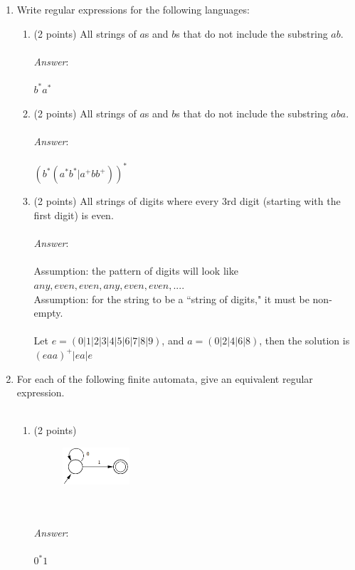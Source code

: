 \documentclass{article}
\begin{document}
\begin{enumerate}
  \item Write regular expressions for the following languages:
  \begin{enumerate}
    \item (2 points) All strings of $a$s and $b$s that do not include the
          substring $ab$.\\\\
      \textit{Answer}:\\\\
      $b^{*}a^{*}$\\

    \item (2 points) All strings of $a$s and $b$s that do not include the
          substring $aba$.\\\\
      \textit{Answer}:\\\\
      $(b^{*}(a^{*}b^{*} | a^{+}bb^{+}))^{*}$\\

    \item (2 points) All strings of digits where every 3rd digit (starting
          with the first digit) is even.\\\\
      \textit{Answer}: \\\\
      Assumption: the pattern of digits will look like
      $any, even, even, any, even, even, ...$.\\
      Assumption: for the string to be a ``string of digits," it must be non-empty.\\\\
      Let $e = (0|1|2|3|4|5|6|7|8|9)$, and $a = (0|2|4|6|8)$, then the solution is\\
      $(eaa)^{+} | ea | e$\\
  \end{enumerate}

  \item For each of the following finite automata, give an equivalent regular
        expression.\\\\
  \begin{enumerate}
    \item (2 points)
    \begin{figure}[h]
	\centering
	\includegraphics[width=0.25\textwidth]{WA01_2a}
	\label{fig:WA01_2a}
	\end{figure}
    \\\\
      \textit{Answer}:\\\\
      $0^{*}1$\\


\end{enumerate}
\end{enumerate}
\end{document}

